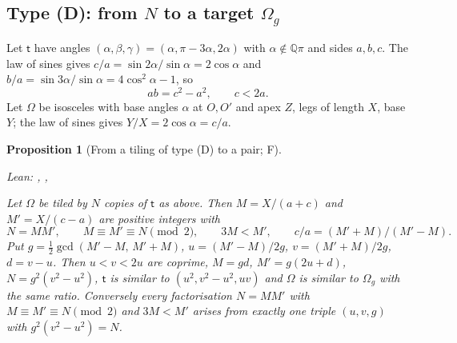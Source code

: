 \documentclass[11pt,reqno]{amsart}
\theoremstyle{plain}
\newtheorem{proposition}[theorem]{Proposition}
\theoremstyle{definition}
\newcommand{\Q}{\mathbb{Q}}
\newcommand{\sF}{\textup{\textsf{F}}}
\begin{document}
\subsection{Type (D): from $N$ to a target $\Omega_{g}$}\label{sub:pair}
Let $\mathsf t$ have angles $(\alpha,\beta,\gamma)=(\alpha,\pi-3\alpha,2\alpha)$ with $\alpha\notin\Q\pi$ and sides $a,b,c$. The law of sines gives $c/a=\sin2\alpha/\sin\alpha=2\cos\alpha$ and $b/a=\sin3\alpha/\sin\alpha=4\cos^2\alpha-1$, so
\begin{equation}\label{eq:abc}
ab=c^2-a^2,\qquad c<2a .
\end{equation}
Let $\Omega$ be isosceles with base angles $\alpha$ at $O,O'$ and apex $Z$, legs of length $X$, base $Y$; the law of sines gives $Y/X=2\cos\alpha=c/a$.
\begin{proposition}[From a tiling of type (D) to a pair; \sF]\label{prop:pair}
{\small\noindent\emph{Lean:} , , \par}
Let $\Omega$ be tiled by $N$ copies of $\mathsf t$ as above. Then $M=X/(a+c)$ and $M'=X/(c-a)$ are positive integers with
\[
N=MM',\qquad M\equiv M'\equiv N\pmod 2,\qquad 3M<M',\qquad c/a=(M'+M)/(M'-M).
\]
Put $g=\tfrac12\gcd(M'-M,\,M'+M)$, $u=(M'-M)/2g$, $v=(M'+M)/2g$, $d=v-u$. Then $u<v<2u$ are coprime, $M=gd$, $M'=g(2u+d)$, $N=g^2(v^2-u^2)$, $\mathsf t$ is similar to $(u^2,v^2-u^2,uv)$ and $\Omega$ is similar to $\Omega_{g}$ with the same ratio. Conversely every factorisation $N=MM'$ with $M\equiv M'\equiv N\pmod2$ and $3M<M'$ arises from exactly one triple $(u,v,g)$ with $g^2(v^2-u^2)=N$.
\end{proposition}
\end{document}

